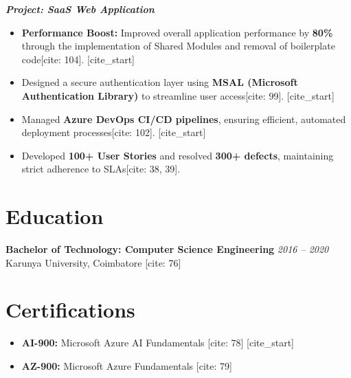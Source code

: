 \documentclass[a4paper,10pt]{article}
\begin{document}
\textbf{\textit{Project: SaaS Web Application}}
\begin{itemize}[leftmargin=*, noitemsep]
    [cite_start]\item \textbf{Performance Boost:} Improved overall application performance by \textbf{80\%} through the implementation of Shared Modules and removal of boilerplate code[cite: 104].
    [cite_start]\item Designed a secure authentication layer using \textbf{MSAL (Microsoft Authentication Library)} to streamline user access[cite: 99].
    [cite_start]\item Managed \textbf{Azure DevOps CI/CD pipelines}, ensuring efficient, automated deployment processes[cite: 102].
    [cite_start]\item Developed \textbf{100+ User Stories} and resolved \textbf{300+ defects}, maintaining strict adherence to SLAs[cite: 38, 39].
\end{itemize}

\section{Education}
\textbf{Bachelor of Technology: Computer Science Engineering} \hfill \textit{2016 -- 2020} \\
[cite_start]Karunya University, Coimbatore [cite: 76]

\section{Certifications}
\begin{itemize}[leftmargin=*, noitemsep]
    [cite_start]\item \textbf{AI-900:} Microsoft Azure AI Fundamentals [cite: 78]
    [cite_start]\item \textbf{AZ-900:} Microsoft Azure Fundamentals [cite: 79]
\end{itemize}

\end{document}
